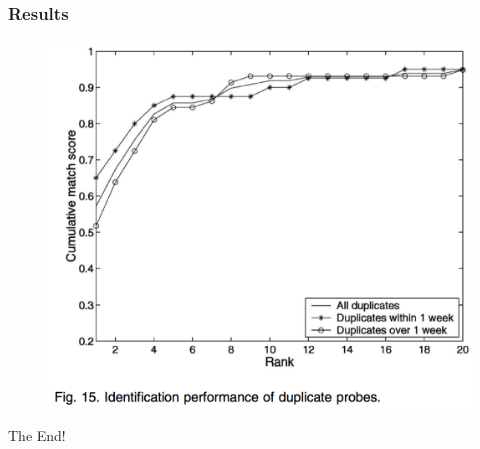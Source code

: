 \documentclass{beamer}
\begin{document}
\begin{frame}
\frametitle{Results}
\begin{figure}
\includegraphics[height=0.8\textheight]{hyperspectralResults2}
\end{figure}
\end{frame}

\begin{frame}
\centerline{The End!}
\end{frame}

\end{document}
